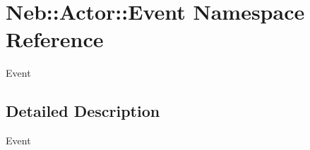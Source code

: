 \hypertarget{namespaceNeb_1_1Actor_1_1Event}{\section{\-Neb\-:\-:\-Actor\-:\-:\-Event \-Namespace \-Reference}
\label{namespaceNeb_1_1Actor_1_1Event}
}


\-Event  




\subsection{\-Detailed \-Description}
\-Event 